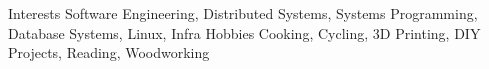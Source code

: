 
\begin{cvinterests}
	\cvinterest
	{Interests} %
	{Software Engineering, Distributed Systems, Systems Programming, Database Systems, Linux, Infra} %
	\cvinterest
	{Hobbies} %
	{Cooking, Cycling, 3D Printing, DIY Projects, Reading, Woodworking} %
\end{cvinterests}
